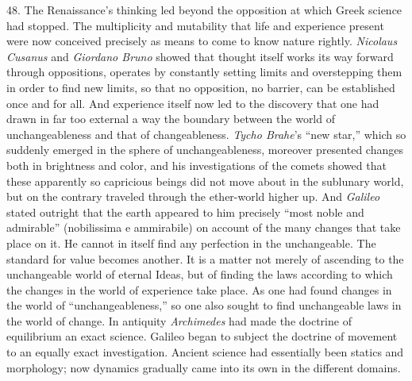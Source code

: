 \documentclass[12pt,a4paper]{book}
\newcommand{\opage}[1]{\marginnote{\footnotesize\textit{[#1]}}}
\begin{document}
48. The Renaissance's thinking led beyond the opposition at which Greek
science had stopped. The multiplicity and mutability that life and
experience present were now conceived precisely as means to come to know
nature rightly. \emph{Nicolaus Cusanus} and \emph{Giordano Bruno} showed
that thought itself works its way forward through oppositions, operates by
constantly setting limits and overstepping them in order to find new
limits, so that no opposition, no barrier, can be established once and for
all. And experience itself now led to the discovery that one had drawn in
far too external a way the boundary between the world of unchangeableness
and that of changeableness. \emph{Tycho Brahe}'s ``new star,'' which so
suddenly emerged in the sphere of unchangeableness, \opage{128}moreover presented
changes both in brightness and color, and his investigations of the comets
showed that these apparently so capricious beings did not move about in the
sublunary world, but on the contrary traveled through the ether-world
higher up. And \emph{Galileo} stated outright that the earth appeared to him
precisely ``most noble and admirable'' (nobilissima e ammirabile) on
account of the many changes that take place on it. He cannot in itself find
any perfection in the unchangeable. The standard for value becomes another.
It is a matter not merely of ascending to the unchangeable world of eternal
Ideas, but of finding the laws according to which the changes in the world
of experience take place. As one had found changes in the world of
``unchangeableness,'' so one also sought to find unchangeable laws in the
world of change. In antiquity \emph{Archimedes} had made the doctrine of
equilibrium an exact science. Galileo began to subject the doctrine of
movement to an equally exact investigation. Ancient science had essentially
been statics and morphology; now dynamics gradually came into its own in
the different domains.
\end{document}
